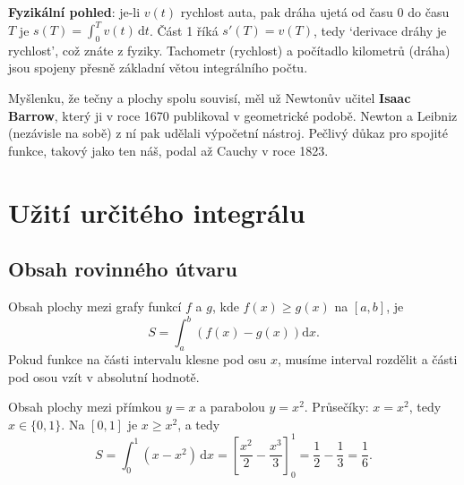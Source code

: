 \begin{definitionbox}
  \textbf{Fyzikální pohled}: je-li $v(t)$ rychlost auta, pak dráha ujetá od času $0$ do času $T$ je $s(T) = \int_0^T v(t)\,\mathrm{d}t$. Část 1 říká $s'(T) = v(T)$, tedy `derivace dráhy je rychlost', což znáte z fyziky. Tachometr (rychlost) a počítadlo kilometrů (dráha) jsou spojeny přesně základní větou integrálního počtu.
\end{definitionbox}

Myšlenku, že tečny a plochy spolu souvisí, měl už Newtonův učitel \textbf{Isaac Barrow}, který ji v roce 1670 publikoval v geometrické podobě. Newton a Leibniz (nezávisle na sobě) z ní pak udělali výpočetní nástroj. Pečlivý důkaz pro spojité funkce, takový jako ten náš, podal až Cauchy v roce 1823.

\section{Užití určitého integrálu}

\subsection{Obsah rovinného útvaru}\label{sec:obsah-utvaru}

\begin{definitionbox}
  Obsah plochy mezi grafy funkcí $f$ a $g$, kde $f(x)\geq g(x)$ na $[a, b]$, je
  \begin{equation*}
    S = \int_a^b\left(f(x) - g(x)\right)\mathrm{d}x.
  \end{equation*}
  Pokud funkce na části intervalu klesne pod osu $x$, musíme interval rozdělit a části pod osou vzít v absolutní hodnotě.
\end{definitionbox}

\begin{example}
  Obsah plochy mezi přímkou $y = x$ a parabolou $y = x^2$. Průsečíky: $x = x^2$, tedy $x\in\{0, 1\}$. Na $[0, 1]$ je $x\geq x^2$, a tedy
  \begin{equation*}
    S = \int_0^1(x - x^2)\,\mathrm{d}x = {\left[\frac{x^2}{2} - \frac{x^3}{3}\right]}_0^1 = \frac{1}{2} - \frac{1}{3} = \frac{1}{6}.
  \end{equation*}
  \begin{center}
  \end{center}
\end{example}


